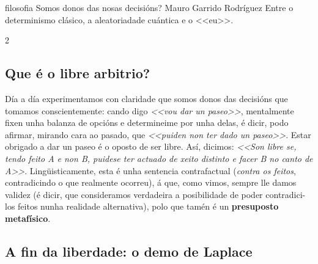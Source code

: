 \Titular%
{filosofia}%
{Somos donos das nosas decisións?}%
{Mauro Garrido Rodríguez}%
{Entre o determinismo clásico, a aleatoriadade cuántica e o <<eu>>.}%

\begin{multicols}{2}

\subsection*{Que é o libre arbitrio?}

Día a día experimentamos con claridade que somos donos das decisións que
tomamos conscientemente: cando digo \textit{<<vou dar un paseo>>}, mentalmente
fixen unha balanza de opcións e determineime por unha delas, é dicir, podo
afirmar, mirando cara ao pasado, que \textit{<<puiden non ter dado un paseo>>}.
Estar obrigado a dar un paseo é o oposto de ser libre. Así, dicimos:
\textit{<<Son libre se, tendo feito A e non B, puidese ter actuado de xeito
distinto e facer B no canto de A>>}. Lingüisticamente, esta é unha sentencia
contrafactual (\textit{contra os feitos}, contradicindo o que realmente
ocorreu), á que, como vimos, sempre lle damos validez (é dicir, que
consideramos verdadeira a posibilidade de poder contradici-los feitos nunha
realidade alternativa), polo que tamén é un \textbf{presuposto metafísico}.

\subsection*{A fin da liberdade: o demo de Laplace}


\end{multicols}

